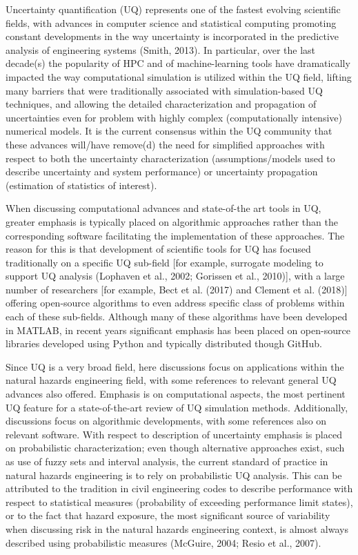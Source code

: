 Uncertainty quantification (UQ) represents one of the fastest evolving scientific fields, with advances in computer science and statistical computing promoting constant developments in the way uncertainty is incorporated in the predictive analysis of engineering systems (Smith, 2013). In particular, over the last decade(s) the popularity of HPC and of machine-learning tools have dramatically impacted the way computational simulation is utilized within the UQ field, lifting many barriers that were traditionally associated with simulation-based UQ techniques, and allowing the detailed characterization and propagation of uncertainties even for problem with highly complex (computationally intensive) numerical models. It is the current consensus within the UQ community that these advances will/have remove(d) the need for simplified approaches with respect to both the uncertainty characterization (assumptions/models used to describe uncertainty and system performance) or uncertainty propagation (estimation of statistics of interest). 

When discussing computational advances and state-of-the art tools in UQ, greater emphasis is typically placed on algorithmic approaches rather than the corresponding software facilitating the implementation of these approaches. The reason for this is that development of scientific tools for UQ has focused traditionally on a specific UQ sub-field [for example, surrogate modeling to support UQ analysis (Lophaven et al., 2002; Gorissen et al., 2010)], with a large number of researchers [for example, Bect et al. (2017) and Clement et al. (2018)] offering open-source algorithms to even address specific class of problems within each of these sub-fields. Although many of these algorithms have been developed in MATLAB, in recent years significant emphasis has been placed on open-source libraries developed using Python and typically distributed though GitHub. 

Since UQ is a very broad field, here discussions focus on applications within the natural hazards engineering field, with some references to relevant general UQ advances also offered. Emphasis is on computational aspects, the most pertinent UQ feature for a state-of-the-art review of UQ simulation methods. Additionally, discussions focus on algorithmic developments, with some references also on relevant software. With respect to description of uncertainty emphasis is placed on probabilistic characterization; even though alternative approaches exist, such as use of fuzzy sets and interval analysis, the current standard of practice in natural hazards engineering is to rely on probabilistic UQ analysis. This can be attributed to the tradition in civil engineering codes to describe performance with respect to statistical measures (probability of exceeding performance limit states), or to the fact that hazard exposure, the most significant source of variability when discussing risk in the natural hazards engineering context, is almost always described using probabilistic measures (McGuire, 2004; Resio et al., 2007). 

